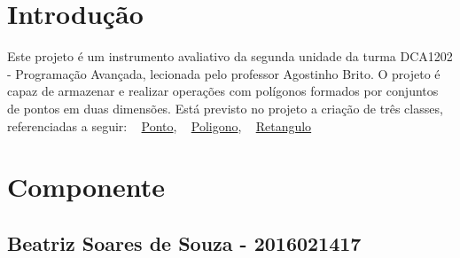 \hypertarget{index_intro}{}\section{Introdução}\label{index_intro}
Este projeto é um instrumento avaliativo da segunda unidade da turma D\+C\+A1202 -\/ Programação Avançada, lecionada pelo professor Agostinho Brito. O projeto é capaz de armazenar e realizar operações com polígonos formados por conjuntos de pontos em duas dimensões. Está previsto no projeto a criação de três classes, referenciadas a seguir\+: ~\newline
 \hyperlink{classPonto}{Ponto}, ~\newline
\hyperlink{classPoligono}{Poligono}, ~\newline
\hyperlink{classRetangulo}{Retangulo}\hypertarget{index_componente}{}\section{Componente}\label{index_componente}
\hypertarget{index_nome}{}\subsection{Beatriz Soares de Souza -\/ 2016021417}\label{index_nome}
